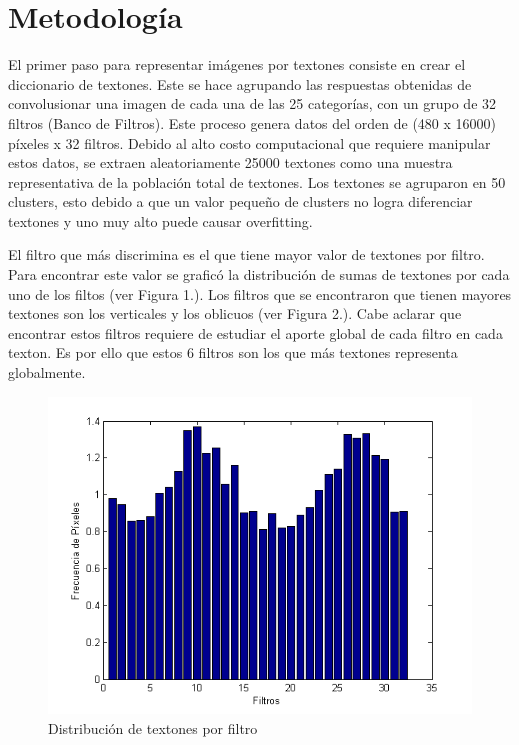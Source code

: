 \documentclass[10pt,twocolumn,letterpaper]{article}
\begin{document}
\section{Metodología}

El primer paso para representar imágenes por textones consiste en crear el diccionario de textones. Este se hace agrupando las respuestas obtenidas de convolusionar una imagen de cada una de las 25 categorías, con un grupo de 32 filtros (Banco de Filtros). Este proceso genera datos del orden de (480 x 16000) píxeles x 32 filtros. Debido al alto costo computacional que requiere manipular estos datos, se extraen aleatoriamente 25000 textones como una muestra representativa de la población total de textones. Los textones se agruparon en 50 clusters, esto debido a que un valor pequeño de clusters no logra diferenciar textones y uno muy alto puede causar overfitting.


El filtro que más discrimina es el que tiene mayor valor de textones por filtro. Para encontrar este valor se graficó la distribución de sumas de textones por cada uno de los filtos (ver Figura 1.). Los filtros que se encontraron que tienen mayores textones son los verticales y los oblicuos (ver Figura 2.). Cabe aclarar que encontrar estos filtros requiere de estudiar el aporte global de cada filtro en cada texton. Es por ello que estos 6 filtros son los que más textones representa globalmente.

\begin{figure}[h]
\begin{center}
   \includegraphics[width=1\linewidth]{Filtros.png}
\end{center}
   \caption{Distribución de textones por filtro}
\label{fig:long}
\label{fig:onecol}
\end{figure}
\end{document}
